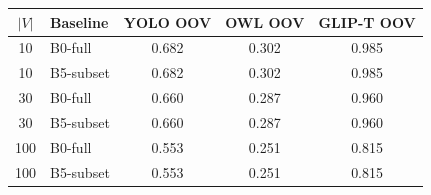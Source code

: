 \begin{tabular}{c l ccc}
\toprule
$|V|$ & Baseline & YOLO OOV & OWL OOV & GLIP-T OOV \\
\midrule
10 & B0-full & 0.682 & 0.302 & 0.985 \\
10 & B5-subset & 0.682 & 0.302 & 0.985 \\
30 & B0-full & 0.660 & 0.287 & 0.960 \\
30 & B5-subset & 0.660 & 0.287 & 0.960 \\
100 & B0-full & 0.553 & 0.251 & 0.815 \\
100 & B5-subset & 0.553 & 0.251 & 0.815 \\
\bottomrule
\end{tabular}
